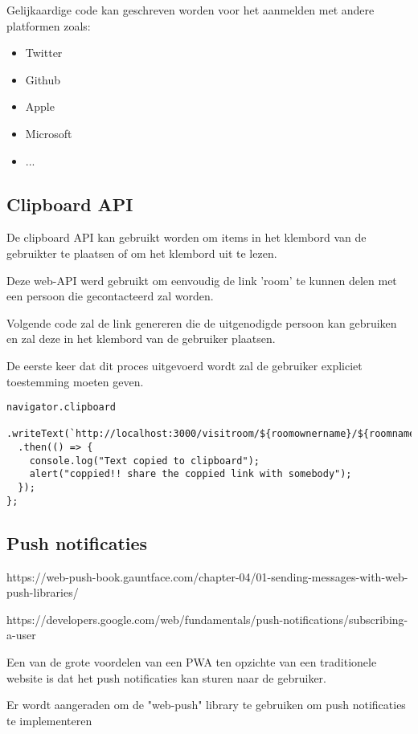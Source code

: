 		Gelijkaardige code kan geschreven worden voor het aanmelden met andere platformen zoals:
		\begin{itemize}
			\item Twitter
			\item Github
			\item Apple
			\item Microsoft
			\item ...
		\end{itemize} 
		
	\subsection{Clipboard API}
	
		De clipboard API kan gebruikt worden om items in het klembord van de gebruikter te plaatsen of om het klembord uit te lezen.
		
		Deze web-API werd gebruikt om eenvoudig de link 'room' te kunnen delen met een persoon die gecontacteerd zal worden.
		
		Volgende code zal de link genereren die de uitgenodigde persoon kan gebruiken en zal deze in het klembord van de gebruiker plaatsen.
		
		De eerste keer dat dit proces uitgevoerd wordt zal de gebruiker expliciet toestemming moeten geven.

\begin{lstlisting}
navigator.clipboard
  .writeText(`http://localhost:3000/visitroom/${roomownername}/${roomname}`)
  .then(() => {
    console.log("Text copied to clipboard");
    alert("coppied!! share the coppied link with somebody");
  });
};
\end{lstlisting}


	\subsection{Push notificaties}
	
	https://web-push-book.gauntface.com/chapter-04/01-sending-messages-with-web-push-libraries/
	
	https://developers.google.com/web/fundamentals/push-notifications/subscribing-a-user
	
		Een van de grote voordelen van een PWA ten opzichte van een traditionele website is dat het push notificaties kan sturen naar de gebruiker.
		
		Er wordt aangeraden om de "web-push" library te gebruiken om push notificaties te implementeren
		
